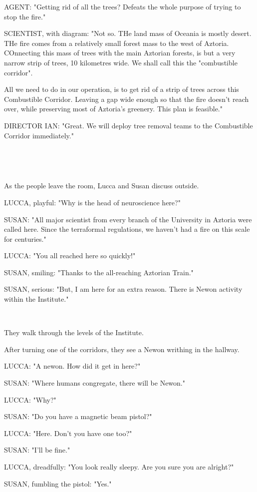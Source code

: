 \documentclass[11pt]{article}
\begin{document}
AGENT: "Getting rid of all the trees? Defeats the whole purpose of trying to stop the fire."

SCIENTIST, with diagram: "Not so.
THe land mass of Oceania is mostly desert.
THe fire comes from a relatively small forest mass to the west of Aztoria.
COnnecting this mass of trees with the main Aztorian forests, is but a very narrow strip of trees, 10 kilometres wide. 
We shall call this the "combustible corridor".

All we need to do in our operation, is to get rid of a strip of trees across this Combustible Corridor.
Leaving a gap wide enough so that the fire doesn't reach over, while preserving most of Aztoria's greenery.
This plan is feasible."

DIRECTOR IAN: "Great. We will deploy tree removal teams to the Combustible Corridor immediately."

\ 

\ 

As the people leave the room, Lucca and Susan discuss outside. 

LUCCA, playful: "Why is the head of neuroscience here?"

SUSAN: "All major scientist from every branch of the University in Aztoria were called here. 
Since the terraformal regulations, we haven't had a fire on this scale for centuries."

LUCCA: "You all reached here so quickly!"

SUSAN, smiling: "Thanks to the all-reaching Aztorian Train."

SUSAN, serious: "But, I am here for an extra reason.
There is Newon activity within the Institute."

\ 

They walk through the levels of the Institute. 

After turning one of the corridors, they see a Newon writhing in the hallway.

LUCCA: "A newon. How did it get in here?"

SUSAN: "Where humans congregate, there will be Newon."

LUCCA: "Why?"

SUSAN: "Do you have a magnetic beam pistol?"

LUCCA: "Here. 
Don't you have one too?"

SUSAN: "I'll be fine."

LUCCA, dreadfully: "You look really sleepy.
Are you sure you are alright?"

SUSAN, fumbling the pistol: "Yes."
\end{document}
